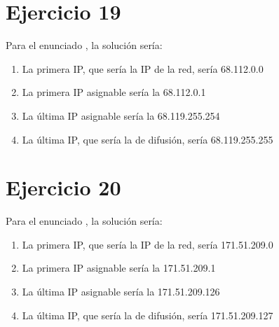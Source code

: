 \documentclass[letterpaper,10pt,spanish]{sphinxmanual}
\begin{document}
\section{Ejercicio 19}
\label{\detokenize{t2_integracion_elementos/ejercicios_subredes_ipv4/rangos_direcciones:id19}}
\sphinxAtStartPar
Para el enunciado , la solución sería:
\begin{enumerate}
%
\item {} 
\sphinxAtStartPar
La primera IP, que sería la IP de la red, sería 68.112.0.0

\item {} 
\sphinxAtStartPar
La primera IP asignable sería la 68.112.0.1

\item {} 
\sphinxAtStartPar
La última IP asignable sería la 68.119.255.254

\item {} 
\sphinxAtStartPar
La última IP, que sería la de difusión, sería 68.119.255.255

\end{enumerate}


\section{Ejercicio 20}
\label{\detokenize{t2_integracion_elementos/ejercicios_subredes_ipv4/rangos_direcciones:id20}}
\sphinxAtStartPar
Para el enunciado , la solución sería:
\begin{enumerate}
%
\item {} 
\sphinxAtStartPar
La primera IP, que sería la IP de la red, sería 171.51.209.0

\item {} 
\sphinxAtStartPar
La primera IP asignable sería la 171.51.209.1

\item {} 
\sphinxAtStartPar
La última IP asignable sería la 171.51.209.126

\item {} 
\sphinxAtStartPar
La última IP, que sería la de difusión, sería 171.51.209.127

\end{enumerate}
\end{document}
